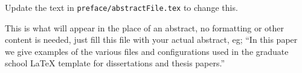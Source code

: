Update the text in \verb|preface/abstractFile.tex| to change this.

This is what will appear in the place of an abstract, no formatting or other content is needed, just fill this file with your actual abstract, eg; ``In this paper we give examples of the various files and configurations used in the graduate school \LaTeX{} template for dissertations and thesis papers.''